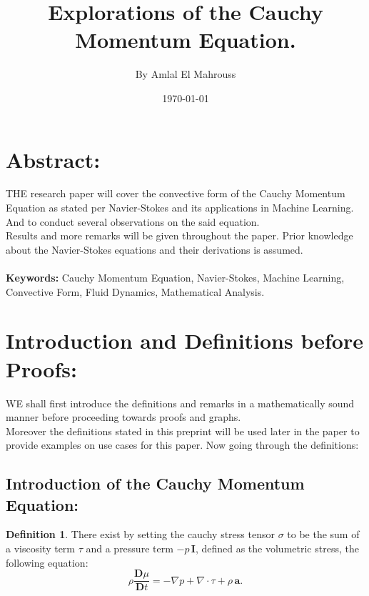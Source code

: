 \documentclass[10pt]{article}
\title{%
	\vspace{-1.5em}%
	\large\textbf{Explorations of the Cauchy Momentum Equation.}%
}
\author{By Amlal El Mahrouss}
\date{\today}
\theoremstyle{plain}
\theoremstyle{definition}
\newtheorem{definition}[theorem]{Definition}
\theoremstyle{remark}
\begin{document}

\maketitle
\tableofcontents
\newpage

\section{Abstract:}

\lettrine[lines=1, lhang=0.1, loversize=0.2]{T}HE research paper will cover the convective form of the Cauchy Momentum Equation as stated per Navier-Stokes and its applications in Machine Learning. And to conduct several observations on the said equation.\\
Results and more remarks will be given throughout the paper. Prior knowledge about the Navier-Stokes equations and their derivations is assumed.\\ \\
\textbf{Keywords:} Cauchy Momentum Equation, Navier-Stokes, Machine Learning, Convective Form, Fluid Dynamics, Mathematical Analysis.

\section{Introduction and Definitions before Proofs:}

\lettrine[lines=1, lhang=0.1, loversize=0.2]{W}E shall first introduce the definitions and remarks in a mathematically sound manner before proceeding towards proofs and graphs.\\Moreover the definitions stated in this preprint will be used later in the paper to provide examples on use cases for this paper. Now going through the definitions:
\subsection{Introduction of the Cauchy Momentum Equation:}
\begin{definition}
There exist by setting the cauchy stress tensor $\sigma$ to be the sum of a viscosity term $\tau$ and a pressure term $-p\, \mathbf{I}$, defined as the volumetric stress, the following equation:
\begin{equation}
\label{eq:cauchy}
  \rho \frac{\mathbf{D}\mu }{\mathbf{D}t} = - \nabla p + \nabla \cdot \tau + \rho \, \textbf{a}.
\end{equation}
\end{definition}
\end{document}

